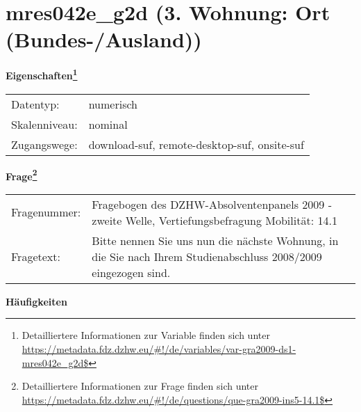 
    \setcounter{footnote}{0}

    \vspace*{-1.8cm}
	\section{mres042e\_g2d (3. Wohnung: Ort (Bundes-/Ausland))}
	\label{section:mres042e_g2d}



    \vspace*{0.5cm}
    \noindent\textbf{Eigenschaften\footnote{Detailliertere Informationen zur Variable finden sich unter
		\url{https://metadata.fdz.dzhw.eu/\#!/de/variables/var-gra2009-ds1-mres042e_g2d$}}}\\
	\begin{tabularx}{\hsize}{@{}lX}
	Datentyp: & numerisch \\
	Skalenniveau: & nominal \\
	Zugangswege: &
	  download-suf, 
	  remote-desktop-suf, 
	  onsite-suf
 \\
    \end{tabularx}



				\vspace*{0.5cm}
                \noindent\textbf{Frage\footnote{Detailliertere Informationen zur Frage finden sich unter
		              \url{https://metadata.fdz.dzhw.eu/\#!/de/questions/que-gra2009-ins5-14.1$}}}\\
				\begin{tabularx}{\hsize}{@{}lX}
					Fragenummer: &
					  Fragebogen des DZHW-Absolventenpanels 2009 - zweite Welle, Vertiefungsbefragung Mobilität:
					  14.1
 \\
					Fragetext: & Bitte nennen Sie uns nun die nächste Wohnung, in die Sie nach Ihrem Studienabschluss 2008/2009 eingezogen sind. \\
				\end{tabularx}





        		\vspace*{0.5cm}
                \noindent\textbf{Häufigkeiten}

